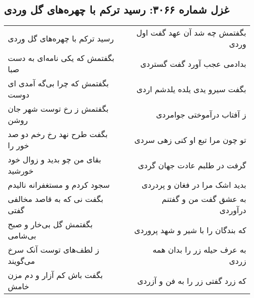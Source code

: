 \begin{center}
\section*{غزل شماره ۳۰۶۶: رسید ترکم با چهره‌های گل وردی}
\label{sec:3066}
\begin{longtable}{l p{0.5cm} r}
رسید ترکم با چهره‌های گل وردی
&&
بگفتمش چه شد آن عهد گفت اول وردی
\\
بگفتمش که یکی نامه‌ای به دست صبا
&&
بدادمی عجب آورد گفت گستردی
\\
بگفتمش که چرا بی‌گه آمدی ای دوست
&&
بگفت سیرو یدی یلده یلدشم اردی
\\
بگفتمش ز رخ توست شهر جان روشن
&&
ز آفتاب درآموختی جوامردی
\\
بگفت طرح نهد رخ رخم دو صد خور را
&&
تو چون مرا تبع او کنی زهی سردی
\\
بقای من چو بدید و زوال خود خورشید
&&
گرفت در طلبم عادت جهان گردی
\\
سجود کردم و مستغفرانه نالیدم
&&
بدید اشک مرا در فغان و پردردی
\\
بگفت نی که به قاصد مخالفی گفتی
&&
به عشق گفت من و گفتنم درآوردی
\\
بگفتمش گل بی‌خار و صبح بی‌شامی
&&
که بندگان را با شیر و شهد پروردی
\\
ز لطف‌های توست آنک سرخ می‌گویند
&&
به عرف حیله زر را بدان همه زردی
\\
بگفت باش کم آزار و دم مزن خامش
&&
که زرد گفتی زر را به فن و آزردی
\\
\end{longtable}
\end{center}
